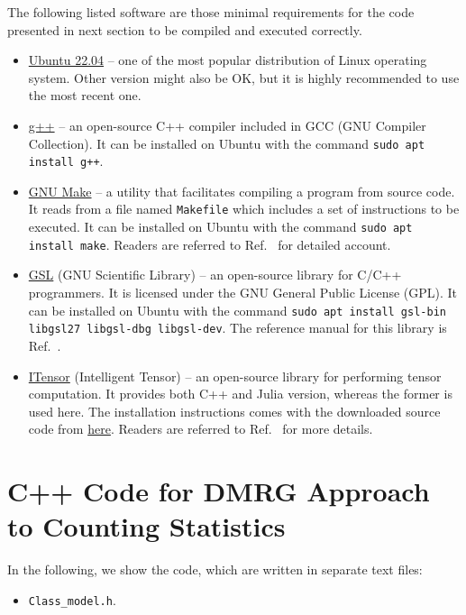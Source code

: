 The following listed software are those minimal requirements for the code presented in next section to be compiled and executed correctly.
\begin{itemize}
\item \href{https://releases.ubuntu.com/22.04/}{Ubuntu 22.04} -- one of the most popular distribution of Linux operating system. Other version might also be OK, but it is highly recommended to use the most recent one.
\item \href{https://gcc.gnu.org/}{g++} -- an open-source C++ compiler included in GCC (GNU Compiler Collection). It can be installed on Ubuntu with the command \texttt{sudo apt install g++}.
\item \href{https://www.gnu.org/software/make/}{GNU Make} -- a utility that facilitates compiling a program from source code. It reads from a file named \texttt{Makefile} which includes a set of instructions to be executed. It can be installed on Ubuntu with the command \texttt{sudo apt install make}. Readers are referred to Ref.~\cite{GrahamCumming_2015} for detailed account.
\item \href{https://www.gnu.org/software/gsl/}{GSL} (GNU Scientific Library) -- an open-source library for C/C++ programmers. It is licensed under the GNU General Public License (GPL). It can be installed on Ubuntu with the command \texttt{sudo apt install gsl-bin libgsl27 libgsl-dbg libgsl-dev}. The reference manual for this library is Ref.~\cite{GSL_manual_2021}.
\item \href{https://itensor.org/}{ITensor} (Intelligent Tensor) -- an open-source library for performing tensor computation. It provides both C++ and Julia version, whereas the former is used here. The installation instructions comes with the downloaded source code from \href{https://github.com/ITensor/ITensor}{here}. Readers are referred to Ref.~\cite{Fishman_SciPostPhysCodeb_2022} for more details.
\end{itemize}





\section*{C++ Code for DMRG Approach to Counting Statistics}


\par In the following, we show the code, which are written in separate text files:
\begin{itemize}
\item \texttt{Class\_model.h}.
\end{itemize}




